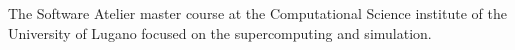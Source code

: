 \documentclass[a4paper,17pt]{extarticle}%
\begin{document}
{{\begin{multicols}{2}
{\begin{figure}
\vspace{-42pt}
\end{figure}
     

The Software Atelier master course at the Computational Science institute of the University of Lugano focused on the supercomputing and simulation.


%
%
%      


 
}
\end{multicols}}}
\end{document}
